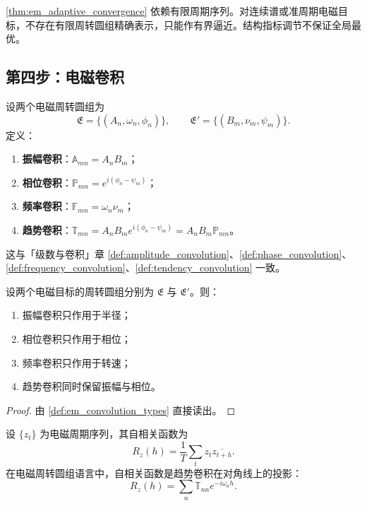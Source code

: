 \begin{remark}[动态调节的边界]\label{rem:em_adaptive_boundary}
\cref{thm:em_adaptive_convergence} 依赖有限周期序列。对连续谱或准周期电磁目标，不存在有限周转圆组精确表示，只能作有界逼近。结构指标调节不保证全局最优。
\end{remark}

\subsection{第四步：电磁卷积}

\begin{definition}\label{def:em_convolution_types}
设两个电磁周转圆组为
\[
\mathfrak E=\{(A_n,\omega_n,\phi_n)\},\qquad
\mathfrak E'=\{(B_m,\nu_m,\psi_m)\}.
\]
定义：
\begin{enumerate}[label=(\roman*)]
    \item \textbf{振幅卷积}：$\mathbb A_{mn}=A_nB_m$；
    \item \textbf{相位卷积}：$\mathbb P_{mn}=e^{i(\phi_n-\psi_m)}$；
    \item \textbf{频率卷积}：$\mathbb F_{mn}=\omega_n\nu_m$；
    \item \textbf{趋势卷积}：$\mathbb T_{mn}=A_nB_m e^{i(\phi_n-\psi_m)}=A_nB_m\mathbb P_{mn}$。
\end{enumerate}
这与「级数与卷积」章 \cref{def:amplitude_convolution}、\cref{def:phase_convolution}、\cref{def:frequency_convolution}、\cref{def:tendency_convolution} 一致。
\end{definition}

\begin{theorem}[三类卷积在电磁周转圆组上的作用]\label{thm:em_convolution_action}
设两个电磁目标的周转圆组分别为 $\mathfrak E$ 与 $\mathfrak E'$。则：
\begin{enumerate}[label=(\roman*)]
    \item 振幅卷积只作用于半径；
    \item 相位卷积只作用于相位；
    \item 频率卷积只作用于转速；
    \item 趋势卷积同时保留振幅与相位。
\end{enumerate}
\end{theorem}

\begin{proof}
由 \cref{def:em_convolution_types} 直接读出。
\end{proof}

\begin{proposition}[自相关与趋势卷积]\label{prop:em_autocorr_phase_convolution}
设 $\{z_t\}$ 为电磁周期序列，其自相关函数为
\[
R_z(h)=\frac1T\sum_t z_t\overline{z_{t+h}}.
\]
在电磁周转圆组语言中，自相关函数是趋势卷积在对角线上的投影：
\[
R_z(h)=\sum_n\mathbb T_{nn}e^{-i\omega_n h}.
\]
\end{proposition}

